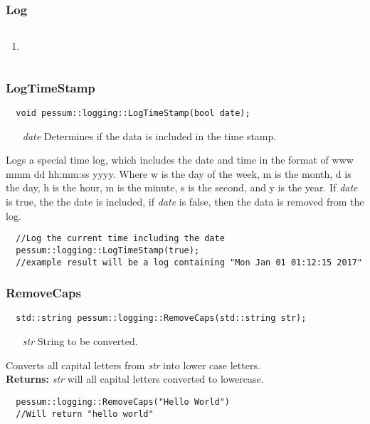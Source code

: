 \documentclass{subfiles}
\begin{document}
\subsubsection{Log}
\begin{lstlisting}

\end{lstlisting}
\begin{enumerate}
	\item
\end{enumerate}
\begin{lstlisting}

\end{lstlisting}
\newpage
\subsubsection{LogTimeStamp}
\begin{lstlisting}
  void pessum::logging::LogTimeStamp(bool date);
\end{lstlisting}
\begin{enumerate}
	\item[\emph{date}] Determines if the data is included in the time stamp.
\end{enumerate}
Logs a special time log, which includes the date and time in the format of www mmm dd hh:mm:ss yyyy. Where w is the day of the week, m is the month, d is the day, h is the hour, m is the minute, s is the second, and y is the year. If \emph{date} is true, the the date is included, if \emph{date} is false, then the data is removed from the log.
\begin{lstlisting}
  //Log the current time including the date
  pessum::logging::LogTimeStamp(true);
  //example result will be a log containing "Mon Jan 01 01:12:15 2017"
\end{lstlisting}
\newpage
\subsubsection{RemoveCaps}
\begin{lstlisting}
  std::string pessum::logging::RemoveCaps(std::string str);
\end{lstlisting}
\begin{enumerate}
	\item[\emph{str}] String to be converted.
\end{enumerate}
Converts all capital letters from \emph{str} into lower case letters.\\
\textbf{Returns:} \emph{str} will all capital letters converted to lowercase.
\begin{lstlisting}
  pessum::logging::RemoveCaps("Hello World")
  //Will return "hello world"
\end{lstlisting}
\newpage
\end{document}
